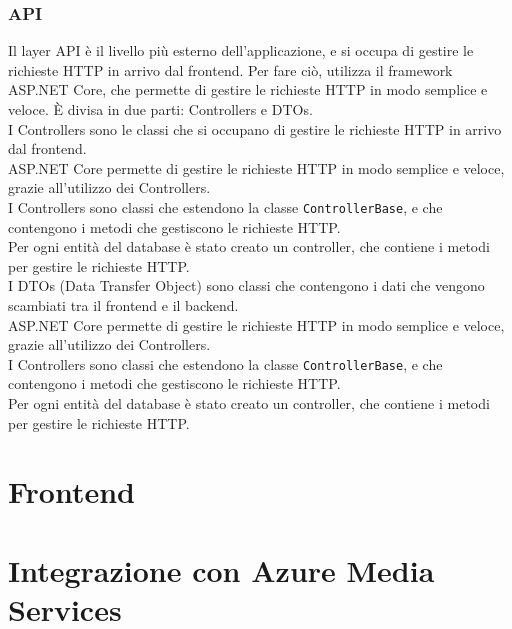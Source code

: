 \subsubsection{API}
Il layer API è il livello più esterno dell'applicazione, e si occupa di gestire le richieste HTTP in arrivo dal frontend. Per fare ciò, utilizza il framework ASP.NET Core, che permette di gestire le richieste HTTP in modo semplice e veloce.
È divisa in due parti: Controllers e DTOs.\\
I Controllers sono le classi che si occupano di gestire le richieste HTTP in arrivo dal frontend.\\
ASP.NET Core permette di gestire le richieste HTTP in modo semplice e veloce, grazie all'utilizzo dei Controllers.\\
I Controllers sono classi che estendono la classe \texttt{ControllerBase}, e che contengono i metodi che gestiscono le richieste HTTP.\\
Per ogni entità del database è stato creato un controller, che contiene i metodi per gestire le richieste HTTP.\\
I DTOs (Data Transfer Object) sono classi che contengono i dati che vengono scambiati tra il frontend e il backend.\\
ASP.NET Core permette di gestire le richieste HTTP in modo semplice e veloce, grazie all'utilizzo dei Controllers.\\
I Controllers sono classi che estendono la classe \texttt{ControllerBase}, e che contengono i metodi che gestiscono le richieste HTTP.\\
Per ogni entità del database è stato creato un controller, che contiene i metodi per gestire le richieste HTTP.\\


\section{Frontend}


\section{Integrazione con Azure Media Services}